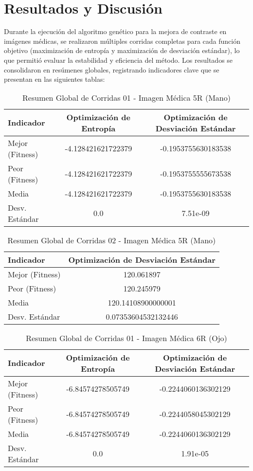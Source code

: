 \chapter{Resultados y Discusión}
\label{chap:resultados}

Durante la ejecución del algoritmo genético para la mejora de contraste en imágenes médicas, se realizaron múltiples corridas completas para cada función objetivo (maximización de entropía y maximización de desviación estándar), lo que permitió evaluar la estabilidad y eficiencia del método. Los resultados se consolidaron en resúmenes globales, registrando indicadores clave que se presentan en las siguientes tablas:

\begin{table}[H]
\centering
\caption{Resumen Global de Corridas 01 - Imagen Médica 5R (Mano)}
\begin{tabular}{lcc}
\hline
\textbf{Indicador} & \textbf{Optimización de Entropía} & \textbf{Optimización de Desviación Estándar} \\
\hline
Mejor (Fitness) & -4.128421621722379 & -0.1953755630183538 \\
Peor (Fitness) & -4.128421621722379 & -0.1953755555673538 \\
Media & -4.128421621722379 & -0.1953755630183538 \\
Desv. Estándar & 0.0 & 7.51e-09 \\
\hline
\end{tabular}
\end{table}

\begin{table}[H]
\centering
\caption{Resumen Global de Corridas 02 - Imagen Médica 5R (Mano)}
\begin{tabular}{lc}
\hline
\textbf{Indicador} & \textbf{Optimización de Desviación Estándar} \\
\hline
Mejor (Fitness) & 120.061897 \\
Peor (Fitness) & 120.245979 \\
Media & 120.14108900000001 \\
Desv. Estándar & 0.07353604532132446 \\
\hline
\end{tabular}
\end{table}

\begin{table}[H]
\centering
\caption{Resumen Global de Corridas 01 - Imagen Médica 6R (Ojo)}
\begin{tabular}{lcc}
\hline
\textbf{Indicador} & \textbf{Optimización de Entropía} & \textbf{Optimización de Desviación Estándar} \\
\hline
Mejor (Fitness) & -6.84574278505749 & -0.2244060136302129 \\
Peor (Fitness) & -6.84574278505749 & -0.2244058045302129 \\
Media & -6.84574278505749 & -0.2244060136302129 \\
Desv. Estándar & 0.0 & 1.91e-05 \\
\hline
\end{tabular}
\end{table}

